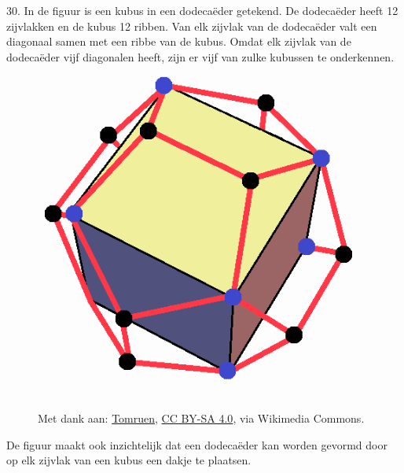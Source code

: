 \clearpage

\begin{problem}{30.}
    In de figuur is een kubus in een dodecaëder getekend. De dode\-caëder heeft 12 zijvlakken en de kubus 12 ribben. Van elk zijvlak van de dodecaëder valt een diagonaal samen met een ribbe van de kubus. Omdat elk zijvlak van de dodecaëder vijf diagonalen heeft, zijn er vijf van zulke kubussen te onderkennen.
    \begin{figure}
        \includegraphics[scale=0.28]{resources/Cube_in_dodecahedron}

        \scriptsize{Met dank aan: \href{https://commons.wikimedia.org/wiki/File:Cube_in_dodecahedron.png?uselang=nl}{Tomruen}, \href{https://creativecommons.org/licenses/by-sa/4.0}{CC BY-SA 4.0}, via Wikimedia Commons.}
    \end{figure}
    De figuur maakt ook inzichtelijk dat een dodecaëder kan worden gevormd door op elk zijvlak van een kubus een dakje te plaatsen.
\end{problem}

